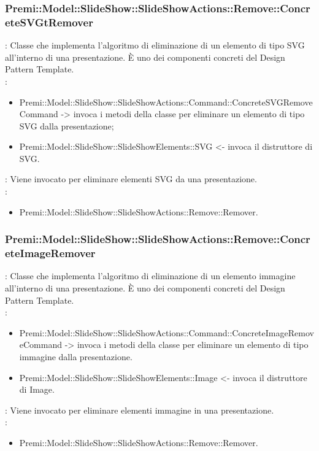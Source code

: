 {       \subsubsection{Premi::Model::SlideShow::SlideShowActions::Remove::ConcreteSVGtRemover}{
				\textbf{\tipo}: Classe che implementa l'algoritmo di eliminazione di un elemento di tipo SVG all’interno di una presentazione.
È uno dei componenti concreti del Design Pattern Template.\\	
				\textbf{\relaz}: 
				\begin{itemize}
					\item Premi::Model::SlideShow::SlideShowActions::Command::ConcreteSVGRemoveCommand -> invoca i metodi della classe per eliminare un elemento di tipo SVG dalla presentazione;
                    \item Premi::Model::SlideShow::SlideShowElements::SVG <- invoca il distruttore di SVG.
				\end{itemize} 
				\textbf{\interfacce}: Viene invocato per eliminare elementi SVG da una presentazione.\\
                \textbf{\base}: 
                    \begin{itemize}
                    \item Premi::Model::SlideShow::SlideShowActions::Remove::Remover.
                    \end{itemize}
			}
       \subsubsection{Premi::Model::SlideShow::SlideShowActions::Remove::ConcreteImageRemover}{
				\textbf{\tipo}: Classe che implementa l'algoritmo di eliminazione di un elemento immagine all’interno di una presentazione.
È uno dei componenti concreti del Design Pattern Template.\\	
				\textbf{\relaz}: 
				\begin{itemize}
					\item Premi::Model::SlideShow::SlideShowActions::Command::ConcreteImageRemoveCommand -> invoca i metodi della classe per eliminare un elemento di tipo immagine dalla presentazione.
                    \item Premi::Model::SlideShow::SlideShowElements::Image <- invoca il distruttore di Image.
				\end{itemize} 
				\textbf{\interfacce}: Viene invocato per eliminare elementi immagine in una presentazione.\\
                \textbf{\base}: 
                    \begin{itemize}
                    \item Premi::Model::SlideShow::SlideShowActions::Remove::Remover.
                    \end{itemize}
			}
}
